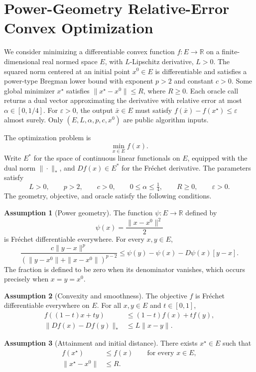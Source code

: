 \documentclass[10pt]{article}
\theoremstyle{definition}
\newtheorem{assumption}{Assumption}
\begin{document}
\section*{Power-Geometry Relative-Error Convex Optimization}
We consider minimizing a differentiable convex function $f:E\to\mathbb{R}$ on a finite-dimensional real normed space $E$, with $L$-Lipschitz derivative, $L>0$. The squared norm centered at an initial point $x^0\in E$ is differentiable and satisfies a power-type Bregman lower bound with exponent $p>2$ and constant $c>0$. Some global minimizer $x^\star$ satisfies $\|x^\star-x^0\|\leq R$, where $R\geq0$. Each oracle call returns a dual vector approximating the derivative with relative error at most $\alpha\in[0,1/4]$. For $\varepsilon>0$, the output $\bar{x}\in E$ must satisfy $f(\bar{x})-f(x^\star)\leq\varepsilon$ almost surely. Only $(E,L,\alpha,p,c,x^0)$ are public algorithm inputs.

The optimization problem is
\[
\min_{x\in E} f(x).
\]
Write $E^*$ for the space of continuous linear functionals on $E$, equipped with the dual norm $\|\cdot\|_*$, and $Df(x)\in E^*$ for the Fr\'echet derivative. The parameters satisfy
\[
L>0,\qquad p>2,\qquad c>0,\qquad
0\leq\alpha\leq\tfrac14,\qquad R\geq0,\qquad\varepsilon>0.
\]
The geometry, objective, and oracle satisfy the following conditions.

\begin{assumption}[Power geometry]
The function $\psi:E\to\mathbb{R}$ defined by
\[
\psi(x)=\frac{\|x-x^0\|^2}{2}
\]
is Fr\'echet differentiable everywhere. For every $x,y\in E$,
\[
\frac{c\|y-x\|^p}
{(\|y-x^0\|+\|x-x^0\|)^{p-2}}
\leq \psi(y)-\psi(x)-D\psi(x)[y-x].
\]
The fraction is defined to be zero when its denominator vanishes, which occurs precisely when $x=y=x^0$.
\end{assumption}

\begin{assumption}[Convexity and smoothness]
The objective $f$ is Fr\'echet differentiable everywhere on $E$. For all $x,y\in E$ and $t\in[0,1]$,
\begin{align*}
f((1-t)x+ty)&\leq(1-t)f(x)+tf(y),\\
\|Df(x)-Df(y)\|_*&\leq L\|x-y\|.
\end{align*}
\end{assumption}

\begin{assumption}[Attainment and initial distance]
There exists $x^\star\in E$ such that
\begin{align*}
f(x^\star)&\leq f(x)\qquad\text{for every }x\in E,\\
\|x^\star-x^0\|&\leq R.
\end{align*}
\end{assumption}
\end{document}
